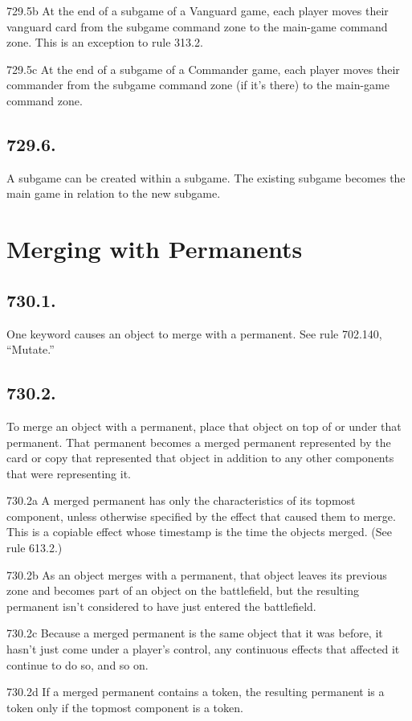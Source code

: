 729.5b At the end of a subgame of a Vanguard game, each player moves their vanguard card from the subgame command zone to the main-game command zone. This is an exception to rule 313.2.

729.5c At the end of a subgame of a Commander game, each player moves their commander from the subgame command zone (if it’s there) to the main-game command zone.

\subsection*{729.6.}
A subgame can be created within a subgame. The existing subgame becomes the main game in relation to the new subgame.

\section{Merging with Permanents}
\subsection*{730.1.}
One keyword causes an object to merge with a permanent. See rule 702.140, “Mutate.”

\subsection*{730.2.}
To merge an object with a permanent, place that object on top of or under that permanent. That permanent becomes a merged permanent represented by the card or copy that represented that object in addition to any other components that were representing it.

730.2a A merged permanent has only the characteristics of its topmost component, unless otherwise specified by the effect that caused them to merge. This is a copiable effect whose timestamp is the time the objects merged. (See rule 613.2.)

730.2b As an object merges with a permanent, that object leaves its previous zone and becomes part of an object on the battlefield, but the resulting permanent isn’t considered to have just entered the battlefield.

730.2c Because a merged permanent is the same object that it was before, it hasn’t just come under a player’s control, any continuous effects that affected it continue to do so, and so on.

730.2d If a merged permanent contains a token, the resulting permanent is a token only if the topmost component is a token.

